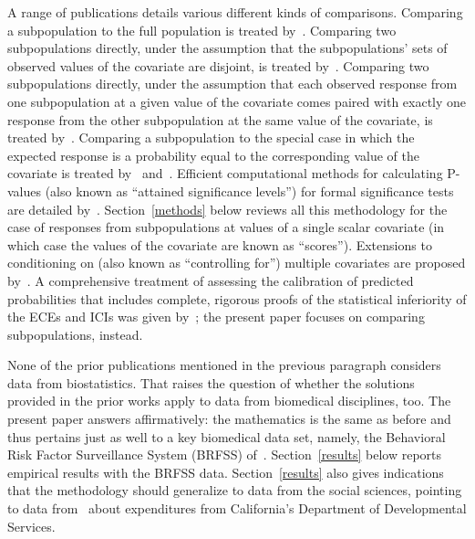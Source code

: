 \documentclass[]{fairmeta}
\begin{document}
A range of publications details various different kinds of comparisons.
Comparing a subpopulation to the full population
is treated by~\cite{tygert_full}.
Comparing two subpopulations directly, under the assumption
that the subpopulations' sets of observed values of the covariate are disjoint,
is treated by~\cite{tygert_two}.
Comparing two subpopulations directly, under the assumption
that each observed response from one subpopulation at a given value
of the covariate comes paired with exactly one response
from the other subpopulation at the same value of the covariate,
is treated by~\cite{kloumann-korevaar-mcconnell-tygert-zhao}.
Comparing a subpopulation to the special case in which the expected response
is a probability equal to the corresponding value of the covariate
is treated by~\cite{arrieta-ibarra-gujral-tannen-tygert-xu}
and~\cite{tygert_full}.
Efficient computational methods for calculating P-values
(also known as ``attained significance levels'') for formal significance tests
are detailed by~\cite{tygert_pvals}.
Section~\ref{methods} below reviews all this methodology
for the case of responses from subpopulations at values
of a single scalar covariate (in which case the values of the covariate
are known as ``scores'').
Extensions to conditioning on (also known as ``controlling for'')
multiple covariates are proposed by~\cite{tygert_multidim}.
A comprehensive treatment of assessing the calibration
of predicted probabilities that includes complete, rigorous proofs
of the statistical inferiority of the ECEs and ICIs was given
by~\cite{arrieta-ibarra-gujral-tannen-tygert-xu}; the present paper focuses
on comparing subpopulations, instead.

None of the prior publications mentioned in the previous paragraph
considers data from biostatistics.
That raises the question of whether the solutions provided in the prior works
apply to data from biomedical disciplines, too.
The present paper answers affirmatively: the mathematics is the same as before
and thus pertains just as well to a key biomedical data set,
namely, the Behavioral Risk Factor Surveillance System (BRFSS) of~\cite{brfss}.
Section~\ref{results} below reports empirical results with the BRFSS data.
Section~\ref{results} also gives indications that the methodology
should generalize to data from the social sciences, pointing
to data from~\cite{taylor-mickel} about expenditures
from California's Department of Developmental Services.
\end{document}
